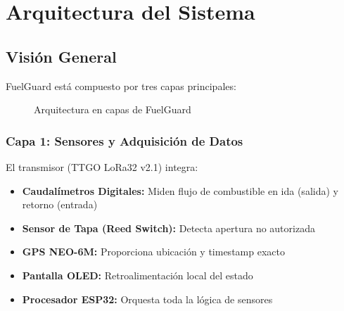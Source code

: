 \documentclass[12pt,a4paper,oneside]{report}
\begin{document}
\chapter{Arquitectura del Sistema}

\section{Visión General}

FuelGuard está compuesto por tres capas principales:

\begin{figure}[H]
    \centering
    \caption{Arquitectura en capas de FuelGuard}
\end{figure}

\subsection{Capa 1: Sensores y Adquisición de Datos}

El transmisor (TTGO LoRa32 v2.1) integra:

\begin{itemize}
    \item \textbf{Caudalímetros Digitales:} Miden flujo de combustible en ida (salida) y retorno (entrada)
    \item \textbf{Sensor de Tapa (Reed Switch):} Detecta apertura no autorizada
    \item \textbf{GPS NEO-6M:} Proporciona ubicación y timestamp exacto
    \item \textbf{Pantalla OLED:} Retroalimentación local del estado
    \item \textbf{Procesador ESP32:} Orquesta toda la lógica de sensores
\end{itemize}
\end{document}
